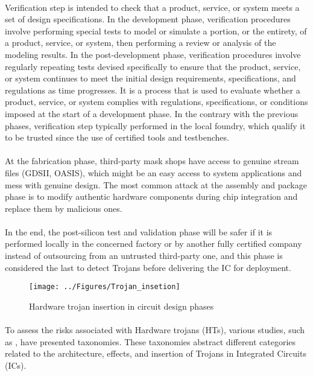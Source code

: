 \paragraph*{}
Verification step is intended to check that a product, service, or system meets a set of design specifications. In the development phase, verification procedures involve performing special tests to model or simulate a portion, or the entirety, of a product, service, or system, then performing a review or analysis of the modeling results. In the post-development phase, verification procedures involve regularly repeating tests devised specifically to ensure that the product, service, or system continues to meet the initial design requirements, specifications, and regulations as time progresses. It is a process that is used to evaluate whether a product, service, or system complies with regulations, specifications, or conditions imposed at the start of a development phase. In the contrary with the previous phases, verification step typically performed in the local foundry, which qualify it to be trusted since the use of certified tools and testbenches.
\paragraph*{}
At the fabrication phase, third-party mask shops have access to genuine stream files (GDSII, OASIS), which might be an easy access to system applications and mess with genuine design. The most common attack at the assembly and package phase is to modify authentic hardware components during chip integration and replace them by malicious ones.
\paragraph*{}
In the end, the post-silicon test and validation phase will be safer if it is performed locally in the concerned factory or by another fully certified company instead of outsourcing from an untrusted third-party one, and this phase is considered the last to detect Trojans before delivering the IC for deployment.
\begin{figure}[h]
	\centering
	\texttt{[image: ../Figures/Trojan\_insetion]}
	\caption{Hardware trojan insertion in circuit design phases}
	\label{fig:trojaninsetion}
\end{figure}

\paragraph*{}
To assess the risks associated with Hardware trojans (HTs), various studies, such as \cite{insert01} , have presented taxonomies. These taxonomies abstract different categories related to the architecture, effects, and insertion of Trojans in Integrated Circuits (ICs).

